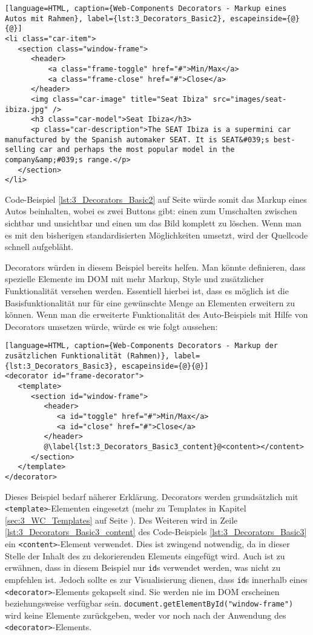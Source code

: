 \begin{lstlisting}[language=HTML, caption={Web-Components Decorators - Markup eines Autos mit Rahmen}, label={lst:3_Decorators_Basic2}, escapeinside={@}{@}]
<li class="car-item">
   <section class="window-frame">
      <header>
          <a class="frame-toggle" href="#">Min/Max</a>
          <a class="frame-close" href="#">Close</a>
      </header>
      <img class="car-image" title="Seat Ibiza" src="images/seat-ibiza.jpg" />
      <h3 class="car-model">Seat Ibiza</h3>
      <p class="car-description">The SEAT Ibiza is a supermini car manufactured by the Spanish automaker SEAT. It is SEAT&#039;s best-selling car and perhaps the most popular model in the company&amp;#039;s range.</p>
   </section>
</li>
\end{lstlisting}

Code-Beispiel \ref{lst:3_Decorators_Basic2} auf Seite \pageref{lst:3_Decorators_Basic2} würde somit das Markup eines Autos beinhalten, wobei es zwei Buttons gibt: einen zum Umschalten zwischen sichtbar und unsichtbar und einen um das Bild komplett zu löschen.
Wenn man es mit den bisherigen standardisierten Möglichkeiten umsetzt, wird der Quellcode schnell aufgebläht.

Decorators würden in diesem Beispiel bereits helfen. Man könnte definieren, dass spezielle Elemente im DOM mit mehr Markup, Style und zusätzlicher Funktionalität versehen werden. Essentiell hierbei ist, dass es möglich ist die Basisfunktionalität nur für eine gewünschte Menge an Elementen erweitern zu können. Wenn man die erweiterte Funktionalität des Auto-Beispiels mit Hilfe von Decorators umsetzen würde, würde es wie folgt aussehen:

\begin{lstlisting}[language=HTML, caption={Web-Components Decorators - Markup der zusätzlichen Funktionalität (Rahmen)}, label={lst:3_Decorators_Basic3}, escapeinside={@}{@}]
<decorator id="frame-decorator">
   <template>
      <section id="window-frame">
         <header>
            <a id="toggle" href="#">Min/Max</a>
            <a id="close" href="#">Close</a>
         </header>
         @\label{lst:3_Decorators_Basic3_content}@<content></content>
      </section>
   </template>
</decorator>
\end{lstlisting}

Dieses Beispiel bedarf näherer Erklärung. Decorators werden grundsätzlich mit \lstinline|<template>|-Elementen eingesetzt (mehr zu Templates in Kapitel \ref{sec:3_WC_Templates} auf Seite \pageref{sec:3_WC_Templates}). Des Weiteren wird in Zeile \ref{lst:3_Decorators_Basic3_content} des Code-Beispiels \ref{lst:3_Decorators_Basic3} ein \lstinline|<content>|-Element verwendet. Dies ist zwingend notwendig, da in dieser Stelle der Inhalt des zu dekorierenden Elements eingefügt wird. Auch ist zu erwähnen, dass in diesem Beispiel nur \lstinline|id|s verwendet werden, was nicht zu empfehlen ist. Jedoch sollte es zur Visualisierung dienen, dass \lstinline|id|s innerhalb eines \lstinline|<decorator>|-Elements gekapselt sind. Sie werden nie im DOM erscheinen beziehungsweise verfügbar sein. \lstinline|document.getElementById("window-frame")| wird keine Elemente zurückgeben, weder vor noch nach der Anwendung des \lstinline|<decorator>|-Elements.

